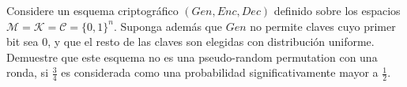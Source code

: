 
Considere un esquema criptográfico $(\textit{Gen}, \textit{Enc}, \textit{Dec})$ definido sobre los espacios $\mathcal{M} = \mathcal{K} = \mathcal{C} = \{0,1\}^n$. Suponga además que $\textit{Gen}$ no permite claves cuyo primer bit sea $0$, y que el resto de las claves son elegidas con distribución uniforme. Demuestre que este esquema no es una pseudo-random permutation con una ronda, si $\frac{3}{4}$ es considerada como una probabilidad significativamente mayor a $\frac{1}{2}$.
